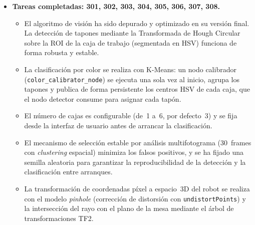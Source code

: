 \documentclass[12pt,a4paper]{article}
\newcommand{\mywphead}[1]{%
  \vspace{8pt}%
  \noindent{\normalsize\bfseries\color{MediumBlue}#1}%
  \par\vspace{3pt}}
\begin{document}
\mywphead{WP-300 -- Sistema de Visión}
\begin{itemize}
  \item \textbf{Tareas completadas: 301, 302, 303, 304, 305, 306, 307, 308.}
  \begin{itemize}
    \item El algoritmo de visión ha sido depurado y optimizado en su versión final. La detección de
          tapones mediante la Transformada de Hough Circular sobre la ROI de la caja de trabajo
          (segmentada en HSV) funciona de forma robusta y estable.
    \item La clasificación por color se realiza con K-Means: un nodo calibrador (\texttt{color\_calibrator\_node})
          se ejecuta una sola vez al inicio, agrupa los tapones y publica de forma persistente
          los centros HSV de cada caja, que el nodo detector consume para asignar cada tapón.
    \item El número de cajas es configurable (de~1 a~6, por defecto~3) y se fija desde la interfaz de
          usuario antes de arrancar la clasificación.
    \item El mecanismo de selección estable por análisis multifotograma (30~frames con \textit{clustering}
          espacial) minimiza los falsos positivos, y se ha fijado una semilla aleatoria para garantizar
          la reproducibilidad de la detección y la clasificación entre arranques.
    \item La transformación de coordenadas píxel a espacio~3D del robot se realiza con el modelo
          \textit{pinhole} (corrección de distorsión con \texttt{undistortPoints}) y la intersección del
          rayo con el plano de la mesa mediante el árbol de transformaciones TF2.
  \end{itemize}
\end{itemize}
\end{document}
